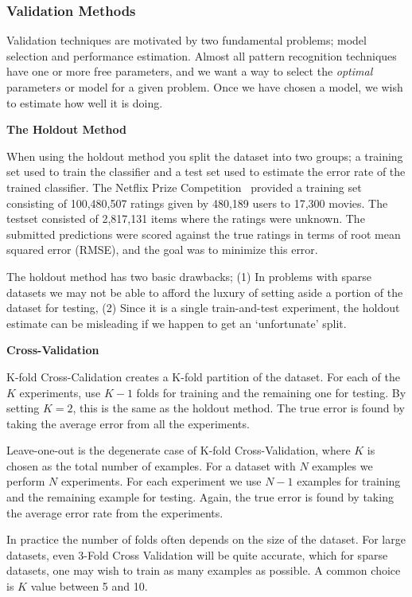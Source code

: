 \subsubsection{Validation Methods}

Validation techniques are motivated by two fundamental problems; model
selection and performance estimation. Almost all pattern recognition techniques
have one or more free parameters, and we want a way to select the
\emph{optimal} parameter\(s\) or model for a given problem. Once we have chosen a
model, we wish to estimate how well it is doing.

\textbf{The Holdout Method}

When using the holdout method you split the dataset into two groups; a training
set used to train the classifier and a test set used to estimate the error rate
of the trained classifier. The Netflix Prize Competition~\cite{Netflix}
provided a training set consisting of 100,480,507 ratings given by 480,189
users to 17,300 movies. The testset consisted of 2,817,131 items where the
ratings were unknown. The submitted predictions were scored against the true
ratings in terms of root mean squared error (RMSE), and the goal was to
minimize this error.

The holdout method has two basic drawbacks; (1) In problems with sparse
datasets we may not be able to afford the luxury of setting aside a portion of
the dataset for testing, (2) Since it is a single train-and-test experiment,
the holdout estimate can be misleading if we happen to get an `unfortunate'
split.

\textbf{Cross-Validation}

K-fold Cross-Calidation creates a K-fold partition of the dataset. For each of
the $K$ experiments, use $K-1$ folds for training and the remaining one for
testing. By setting $K=2$, this is the same as the holdout method. The true
error is found by taking the average error from all the experiments.

Leave-one-out is the degenerate case of K-fold Cross-Validation, where $K$ is
chosen as the total number of examples. For a dataset with $N$ examples we
perform $N$ experiments. For each experiment we use $N-1$ examples for training
and the remaining example for testing. Again, the true error is found by taking
the average error rate from the experiments.

In practice the number of folds often depends on the size of the dataset. For
large datasets, even 3-Fold Cross Validation will be quite accurate, which for
sparse datasets, one may wish to train as many examples as possible. A common
choice is $K$ value between 5 and 10.

